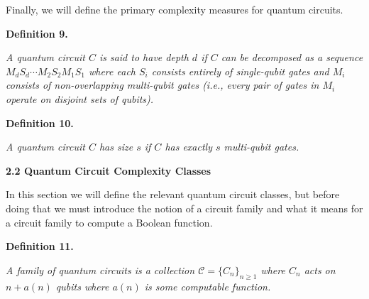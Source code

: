 Finally, we will define the primary complexity measures for quantum circuits.\par





\par\medskip\noindent\textbf{
\textbf{Definition 9}\textbf{.}
}\par



\emph{A quantum circuit $C$ is said to have depth $d$ if $C$ can be decomposed as a sequence $M_{d}S_{d}\cdots M_{2}S_{2}M_{1}S_{1}$ where each $S_{i}$ consists entirely of single-qubit gates and $M_{i}$ consists of non-overlapping multi-qubit gates (i.e., every pair of gates in $M_{i}$ operate on disjoint sets of qubits).}\par







\par\medskip\noindent\textbf{
\textbf{Definition 10}\textbf{.}
}\par



\emph{A quantum circuit $C$ has size $s$ if $C$ has exactly $s$ multi-qubit gates.}\par







\par\medskip\noindent\textbf{
2.2 Quantum Circuit Complexity Classes}\par




In this section we will define the relevant quantum circuit classes, but before doing that we must introduce the notion of a circuit family and what it means for a circuit family to compute a Boolean function.\par





\par\medskip\noindent\textbf{
\textbf{Definition 11}\textbf{.}
}\par



\emph{A family of quantum circuits is a collection $\mathcal{C}=\{C_{n}\}_{n\geq 1}$ where $C_{n}$ acts on $n+a(n)$ qubits where $a(n)$ is some computable function.}\par



